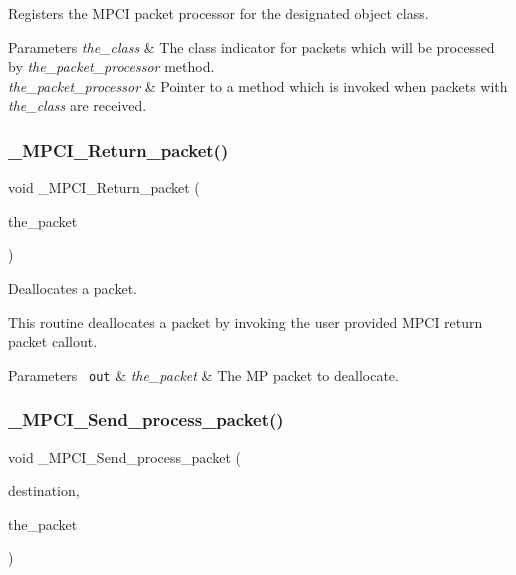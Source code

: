Registers the M\+P\+CI packet processor for the designated object class. 


\begin{DoxyParams}{Parameters}
{\em the\+\_\+class} & The class indicator for packets which will be processed by {\itshape the\+\_\+packet\+\_\+processor} method. \\
\hline
{\em the\+\_\+packet\+\_\+processor} & Pointer to a method which is invoked when packets with {\itshape the\+\_\+class} are received. \\
\hline
\end{DoxyParams}
\mbox{\label{group__RTEMSScoreMPCI_ga4921eb7c6291474df410b099381b09d9}} 
\subsubsection{\texorpdfstring{\_MPCI\_Return\_packet()}{\_MPCI\_Return\_packet()}}
{\footnotesize\ttfamily void \+\_\+\+M\+P\+C\+I\+\_\+\+Return\+\_\+packet (\begin{DoxyParamCaption}\item[{\mbox{\hyperlink{structMP__packet__Prefix}{M\+P\+\_\+packet\+\_\+\+Prefix}} $\ast$}]{the\+\_\+packet }\end{DoxyParamCaption})}



Deallocates a packet. 

This routine deallocates a packet by invoking the user provided M\+P\+CI return packet callout.


\begin{DoxyParams}[1]{Parameters}
\mbox{\texttt{ out}}  & {\em the\+\_\+packet} & The MP packet to deallocate. \\
\hline
\end{DoxyParams}
\mbox{\label{group__RTEMSScoreMPCI_ga02e1e38a1e6a9d3b6488058c89ac96a1}} 
\subsubsection{\texorpdfstring{\_MPCI\_Send\_process\_packet()}{\_MPCI\_Send\_process\_packet()}}
{\footnotesize\ttfamily void \+\_\+\+M\+P\+C\+I\+\_\+\+Send\+\_\+process\+\_\+packet (\begin{DoxyParamCaption}\item[{uint32\+\_\+t}]{destination,  }\item[{\mbox{\hyperlink{structMP__packet__Prefix}{M\+P\+\_\+packet\+\_\+\+Prefix}} $\ast$}]{the\+\_\+packet }\end{DoxyParamCaption})}



